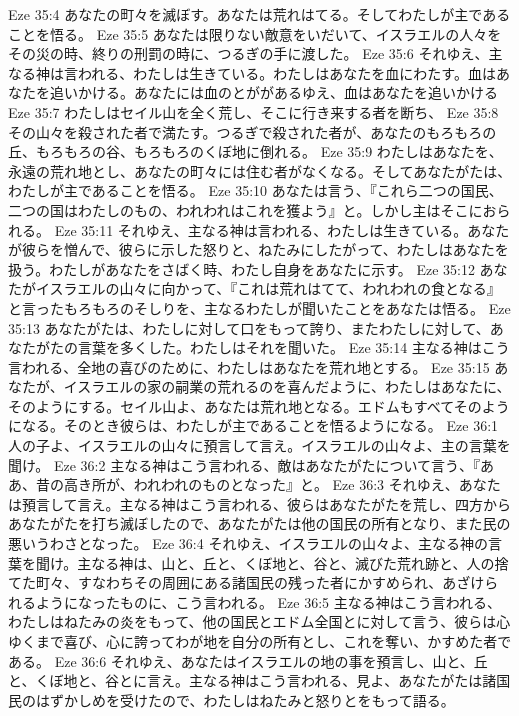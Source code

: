 Eze 35:4  あなたの町々を滅ぼす。あなたは荒れはてる。そしてわたしが主であることを悟る。
Eze 35:5  あなたは限りない敵意をいだいて、イスラエルの人々をその災の時、終りの刑罰の時に、つるぎの手に渡した。
Eze 35:6  それゆえ、主なる神は言われる、わたしは生きている。わたしはあなたを血にわたす。血はあなたを追いかける。あなたには血のとががあるゆえ、血はあなたを追いかける
Eze 35:7  わたしはセイル山を全く荒し、そこに行き来する者を断ち、
Eze 35:8  その山々を殺された者で満たす。つるぎで殺された者が、あなたのもろもろの丘、もろもろの谷、もろもろのくぼ地に倒れる。
Eze 35:9  わたしはあなたを、永遠の荒れ地とし、あなたの町々には住む者がなくなる。そしてあなたがたは、わたしが主であることを悟る。
Eze 35:10  あなたは言う、『これら二つの国民、二つの国はわたしのもの、われわれはこれを獲よう』と。しかし主はそこにおられる。
Eze 35:11  それゆえ、主なる神は言われる、わたしは生きている。あなたが彼らを憎んで、彼らに示した怒りと、ねたみにしたがって、わたしはあなたを扱う。わたしがあなたをさばく時、わたし自身をあなたに示す。
Eze 35:12  あなたがイスラエルの山々に向かって、『これは荒れはてて、われわれの食となる』と言ったもろもろのそしりを、主なるわたしが聞いたことをあなたは悟る。
Eze 35:13  あなたがたは、わたしに対して口をもって誇り、またわたしに対して、あなたがたの言葉を多くした。わたしはそれを聞いた。
Eze 35:14  主なる神はこう言われる、全地の喜びのために、わたしはあなたを荒れ地とする。
Eze 35:15  あなたが、イスラエルの家の嗣業の荒れるのを喜んだように、わたしはあなたに、そのようにする。セイル山よ、あなたは荒れ地となる。エドムもすべてそのようになる。そのとき彼らは、わたしが主であることを悟るようになる。
Eze 36:1  人の子よ、イスラエルの山々に預言して言え。イスラエルの山々よ、主の言葉を聞け。
Eze 36:2  主なる神はこう言われる、敵はあなたがたについて言う、『ああ、昔の高き所が、われわれのものとなった』と。
Eze 36:3  それゆえ、あなたは預言して言え。主なる神はこう言われる、彼らはあなたがたを荒し、四方からあなたがたを打ち滅ぼしたので、あなたがたは他の国民の所有となり、また民の悪いうわさとなった。
Eze 36:4  それゆえ、イスラエルの山々よ、主なる神の言葉を聞け。主なる神は、山と、丘と、くぼ地と、谷と、滅びた荒れ跡と、人の捨てた町々、すなわちその周囲にある諸国民の残った者にかすめられ、あざけられるようになったものに、こう言われる。
Eze 36:5  主なる神はこう言われる、わたしはねたみの炎をもって、他の国民とエドム全国とに対して言う、彼らは心ゆくまで喜び、心に誇ってわが地を自分の所有とし、これを奪い、かすめた者である。
Eze 36:6  それゆえ、あなたはイスラエルの地の事を預言し、山と、丘と、くぼ地と、谷とに言え。主なる神はこう言われる、見よ、あなたがたは諸国民のはずかしめを受けたので、わたしはねたみと怒りとをもって語る。
